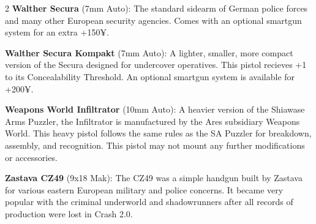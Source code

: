 \documentclass[
  oneside]{article}
\begin{document}
\begin{multicols}{2}
\textbf{Walther Secura} (7mm Auto): The standard
sidearm of German police forces and many other
European security agencies. Comes with an optional
smartgun system for an extra +150¥.

\textbf{Walther Secura Kompakt} (7mm Auto): A
lighter, smaller, more compact version of the
Secura designed for undercover operatives. This
pistol recieves +1 to its Concealability
Threshold. An optional smartgun system is
available for +200¥.

\textbf{Weapons World Infiltrator} (10mm Auto): A
heavier version of the Shiawase Arms Puzzler, the
Infiltrator is manufactured by the Ares subsidiary
Weapons World. This heavy pistol follows the same
rules as the SA Puzzler for breakdown, assembly,
and recognition. This pistol may not mount any
further modifications or accessories.

\textbf{Zastava CZ49} (9x18 Mak): The CZ49 was a
simple handgun built by Zastava for various
eastern European military and police concerns. It
became very popular with the criminal underworld
and shadowrunners after all records of production
were lost in Crash 2.0.

\end{multicols}
\end{document}
